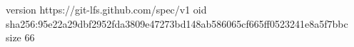 version https://git-lfs.github.com/spec/v1
oid sha256:95e22a29dbf2952fda3809e47273bd148ab586065cf665ff0523241e8a5f7bbc
size 66
